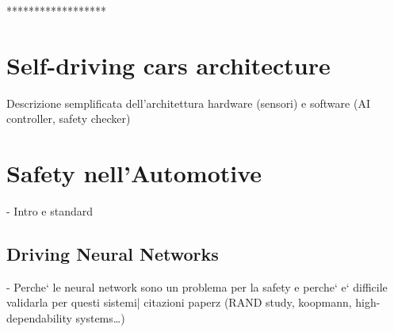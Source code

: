 ******************

\section{Self-driving cars architecture}

Descrizione semplificata dell'architettura hardware (sensori) e software (AI controller, safety checker)

\section{Safety nell'Automotive}

-  Intro e standard

\subsection{Driving Neural Networks}

 - Perche` le neural network sono un problema per la safety e perche` e` difficile validarla per questi sistemi| citazioni paperz (RAND study, koopmann, high-dependability systems\dots)


